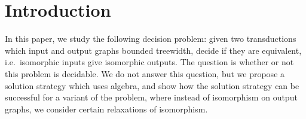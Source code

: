 \section{Introduction}
In this paper, we  study the following decision problem: given two \mso transductions which input and output graphs bounded treewidth, decide if they are equivalent, i.e.~isomorphic inputs give isomorphic outputs. The question is whether or not this problem is decidable. We do not answer this question, but we propose a solution strategy which uses algebra, and show how the solution strategy can be successful for a variant of the problem, where instead of isomorphism on output graphs, we consider certain relaxations of isomorphism.







